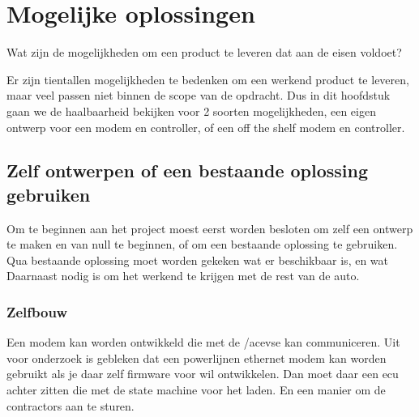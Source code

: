 \chapter{Mogelijke oplossingen}
\label{Mogelijke_oplossingen}

\begin{center}
    \begin{minipage}{0.5\textwidth}
        \begin{small}
            Wat zijn de mogelijkheden om een product te leveren dat aan de
            eisen voldoet?
        \end{small} 
    \end{minipage}
    \vspace{0.5cm}
\end{center}

Er zijn tientallen  mogelijkheden te bedenken om een werkend product te
leveren, maar veel passen niet binnen de scope van de opdracht. Dus in dit
hoofdstuk gaan we de haalbaarheid bekijken voor 2 soorten mogelijkheden, een
eigen ontwerp voor een modem en controller, of een off the shelf modem en
controller.

\section{Zelf ontwerpen of een bestaande oplossing gebruiken}

Om te beginnen aan het project moest eerst worden besloten om zelf een ontwerp
te maken en van null te beginnen, of om een bestaande oplossing te gebruiken.
Qua bestaande oplossing moet worden gekeken wat er beschikbaar is, en wat
Daarnaast nodig is om het werkend te krijgen met de rest van de auto.

\subsection{Zelfbouw}

Een modem kan worden ontwikkeld die met de /ac{evse} kan communiceren. Uit voor
onderzoek is gebleken dat een powerlijnen ethernet modem kan worden gebruikt
als je daar zelf firmware voor wil ontwikkelen. Dan moet daar een \ac{ecu}
achter zitten die met de state machine voor het laden. En een manier om de
contractors aan te sturen.

